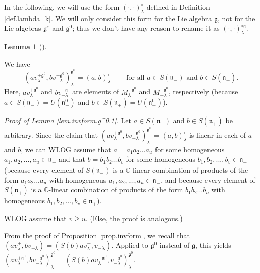 \documentclass
[numbers=enddot,12pt,final,onecolumn,german,notitlepage]{scrartcl}%
\theoremstyle{definition}
\newtheorem{lem}[theo]{Lemma}
\newenvironment{lemma}[1][]
{\begin{lem}[#1]\begin{leftbar}}
{\end{leftbar}\end{lem}}
\begin{document}
In the following, we will use the form $\left(  \cdot,\cdot\right)  _{\lambda
}^{\circ}$ defined in Definition \ref{def.lambda_k}. We will only consider
this form for the Lie algebra $\mathfrak{g}$, not for the Lie algebras
$\mathfrak{g}^{\varepsilon}$ and $\mathfrak{g}^{0}$; thus we don't have any
reason to rename it as $\left(  \cdot,\cdot\right)  _{\lambda}^{\circ
\mathfrak{g}}$.

\begin{lemma}
\label{lem.invform.g^0.1}We have%
\begin{equation}
\left(  av_{\lambda}^{+\mathfrak{g}^{0}},bv_{-\lambda}^{-\mathfrak{g}^{0}%
}\right)  _{\lambda}^{\mathfrak{g}^{0}}=\left(  a,b\right)  _{\lambda}^{\circ
}\ \ \ \ \ \ \ \ \ \ \text{for all }a\in S\left(  \mathfrak{n}_{-}\right)
\text{ and }b\in S\left(  \mathfrak{n}_{+}\right)  . \label{prop.det.US.pf.1}%
\end{equation}
Here, $av_{\lambda}^{+\mathfrak{g}^{0}}$ and $bv_{-\lambda}^{-\mathfrak{g}%
^{0}}$ are elements of $M_{\lambda}^{+\mathfrak{g}^{0}}$ and $M_{-\lambda
}^{-\mathfrak{g}^{0}}$, respectively (because $a\in S\left(  \mathfrak{n}%
_{-}\right)  =U\left(  \mathfrak{n}_{-}^{0}\right)  $ and $b\in S\left(
\mathfrak{n}_{+}\right)  =U\left(  \mathfrak{n}_{+}^{0}\right)  $).
\end{lemma}

\textit{Proof of Lemma \ref{lem.invform.g^0.1}.} Let $a\in S\left(
\mathfrak{n}_{-}\right)  $ and $b\in S\left(  \mathfrak{n}_{+}\right)  $ be
arbitrary. Since the claim that $\left(  av_{\lambda}^{+\mathfrak{g}^{0}%
},bv_{-\lambda}^{-\mathfrak{g}^{0}}\right)  _{\lambda}^{\mathfrak{g}^{0}%
}=\left(  a,b\right)  _{\lambda}^{\circ}$ is linear in each of $a$ and $b$, we
can WLOG assume that $a=a_{1}a_{2}...a_{u}$ for some homogeneous $a_{1}%
,a_{2},...,a_{u}\in\mathfrak{n}_{-}$ and that $b=b_{1}b_{2}...b_{v}$ for some
homogeneous $b_{1},b_{2},...,b_{v}\in\mathfrak{n}_{+}$ (because every element
of $S\left(  \mathfrak{n}_{-}\right)  $ is a $\mathbb{C}$-linear combination
of products of the form $a_{1}a_{2}...a_{u}$ with homogeneous $a_{1}%
,a_{2},...,a_{u}\in\mathfrak{n}_{-}$, and because every element of $S\left(
\mathfrak{n}_{+}\right)  $ is a $\mathbb{C}$-linear combination of products of
the form $b_{1}b_{2}...b_{v}$ with homogeneous $b_{1},b_{2},...,b_{v}%
\in\mathfrak{n}_{+}$).

WLOG assume that $v\geq u$. (Else, the proof is analogous.)

From the proof of Proposition \ref{prop.invform}, we recall that $\left(
av_{\lambda}^{+},bv_{-\lambda}^{-}\right)  =\left(  S\left(  b\right)
av_{\lambda}^{+},v_{-\lambda}^{-}\right)  $. Applied to $\mathfrak{g}^{0}$
instead of $\mathfrak{g}$, this yields $\left(  av_{\lambda}^{+\mathfrak{g}%
^{0}},bv_{-\lambda}^{-\mathfrak{g}^{0}}\right)  _{\lambda}^{\mathfrak{g}^{0}%
}=\left(  S\left(  b\right)  av_{\lambda}^{+\mathfrak{g}^{0}},v_{-\lambda
}^{-\mathfrak{g}^{0}}\right)  _{\lambda}^{\mathfrak{g}^{0}}$.
\end{document}
